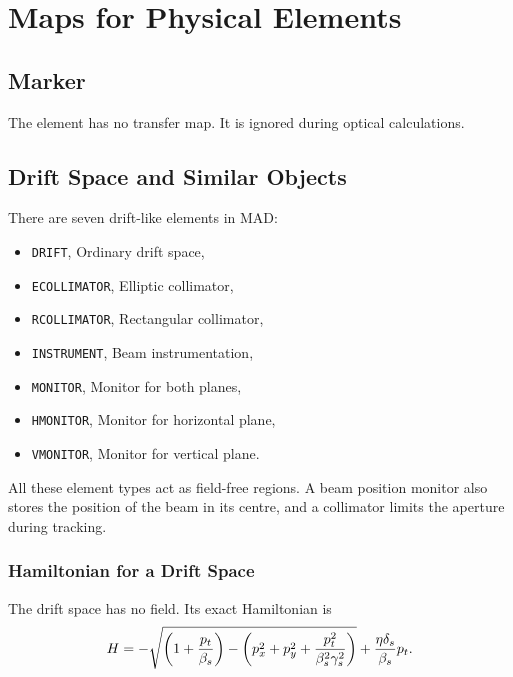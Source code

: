  
 
\chapter{Maps for Physical Elements}
\label{element}
 
\section{Marker}
The  element has no transfer map.
It is ignored during optical calculations.
 
 
\section{Drift Space and Similar Objects}
There are seven drift-like elements in MAD:
\begin{itemize}
\item {\tt DRIFT}, Ordinary drift space,
\item {\tt ECOLLIMATOR}, Elliptic collimator, 
\item {\tt RCOLLIMATOR}, Rectangular collimator,
\item {\tt INSTRUMENT}, Beam instrumentation,  
\item {\tt MONITOR}, Monitor for both planes, 
\item {\tt HMONITOR}, Monitor for horizontal plane,
\item {\tt VMONITOR}, Monitor for vertical plane.
\end{itemize}
All these element types act as field-free regions.
A beam position monitor also stores the position of the beam in its
centre,
and a collimator limits the aperture during tracking.
 
\subsection{Hamiltonian for a Drift Space}
The drift space has no field.  Its exact Hamiltonian is
\begin{equation}
H = - \sqrt{\left(1+\frac{p_t}{\beta_s}\right)-\left(p_x^2+p_y^2+\frac{p_t^2}{\beta_s^2\gamma_s^2}\right)}+
\frac{\eta \delta_s}{\beta_s} p_t.
\end{equation}
 
